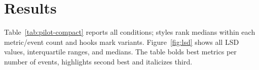 \documentclass[conference]{IEEEtran}
\begin{document}
\section{Results}
Table~\ref{tab:pilot-compact} reports all conditions; styles rank medians within
each metric/event count and hooks mark variants. Figure~\ref{fig:lsd} shows all
LSD values, interquartile ranges, and medians. The table bolds best metrics per number of events, highlights second best and italicizes third. 
\end{document}
